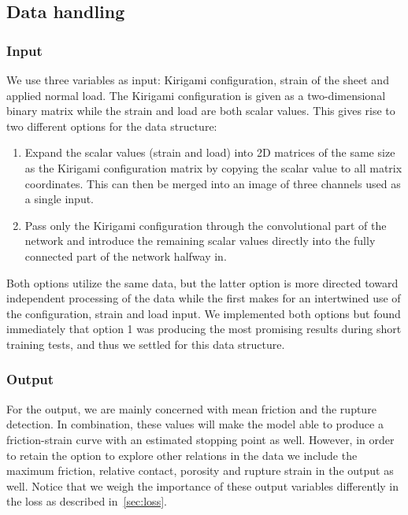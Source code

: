 \subsection{Data handling}
\subsubsection{Input}
We use three variables as input: Kirigami configuration, strain of the sheet
and applied normal load. The Kirigami configuration is given as a two-dimensional binary matrix while the strain and load are both scalar values. This gives rise to two different options for the data structure:
\begin{enumerate}
  \item Expand the scalar values (strain and load) into 2D matrices of the same
  size as the Kirigami configuration matrix by copying the scalar value to all matrix coordinates. This can then be merged into an image of three channels used as a single input.  
  \item Pass only the Kirigami configuration through the convolutional part of the network and introduce the remaining scalar values directly into the fully connected part of the network halfway in. 
\end{enumerate}
Both options utilize the same data, but the latter option is more directed toward independent processing of the data while the first makes for an intertwined use of the configuration, strain and load input. We implemented both options but found immediately that option 1 was producing the most promising results during short training tests, and thus we settled for this data structure. 

\subsubsection{Output}
For the output, we are mainly concerned with mean friction and the rupture
detection. In combination, these values will make the model able to produce a friction-strain curve with an estimated stopping point as well. However, in order to retain the option to explore other relations in the data we include the maximum friction, relative contact, porosity and rupture strain in the output as well. Notice that we weigh the importance of these output variables differently in the loss as described in~\cref{sec:loss}. 


